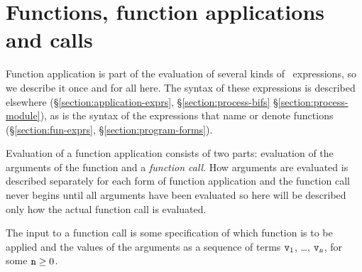 \section{Functions, function applications and calls}

\label{section:function-application}

Function application is part of the evaluation of several kinds of
\Erlang\ expressions, so we describe it once and for all here. The
syntax of these expressions is described elsewhere
(\S\ref{section:application-exprs},
\ifOld\S\ref{section:process-bifs}\fi
\ifStd\S\ref{section:process-module}\fi), as is the
syntax of the expressions that name or denote functions
(\S\ref{section:fun-exprs},
\S\ref{section:program-forms}).

Evaluation of a function application consists of two parts: evaluation
of the arguments of the function and a
\emph{function call}.  How arguments are evaluated is described
separately for each form of function application and the function call
never begins until all arguments have been evaluated so here will be
described only how the actual function call is evaluated.

The input to a function call is some specification of which function
is to be applied and the values of the arguments as a sequence of
terms ${\tt{\sl v}}_1$, \ldots, ${\tt{\sl v}}_{\mbox{\scriptsize\tt{\sl{n}}}}$, for some ${\tt{\sl n}}\geq 0$.

